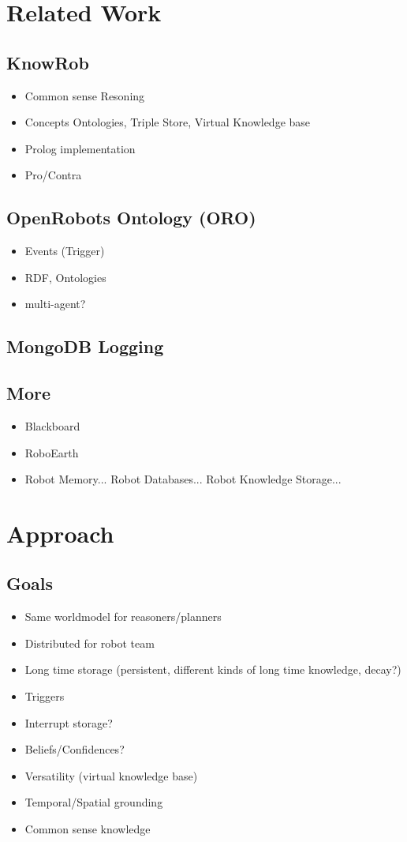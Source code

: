 \documentclass[a4paper,11pt]{article}
\begin{document}
\section{Related Work}
\label{sec:related}
\subsection{KnowRob}
\label{sec:knowrob}
\begin{itemize}
\item Common sense Resoning
\item Concepts Ontologies, Triple Store, Virtual Knowledge base
\item Prolog implementation
\item Pro/Contra
\end{itemize}
\subsection{OpenRobots Ontology (ORO)}
\begin{itemize}
\item Events (Trigger)
\item RDF, Ontologies
\item multi-agent?
\end{itemize}
\subsection{MongoDB Logging}
\label{sec:mongo-logging}
\subsection{More}
\begin{itemize}
\item Blackboard
\item RoboEarth
\item Robot Memory... Robot Databases... Robot Knowledge Storage...
\end{itemize}


\section{Approach}
\label{sec:approach}
\subsection{Goals}
\label{sec:goals}
\begin{itemize}
\item Same worldmodel for reasoners/planners
\item Distributed for robot team
\item Long time storage (persistent, different kinds of long time knowledge, decay?)
\item Triggers
\item Interrupt storage?
\item Beliefs/Confidences?
\item Versatility (virtual knowledge base)
\item Temporal/Spatial grounding
\item Common sense knowledge
\end{itemize}
\end{document}

